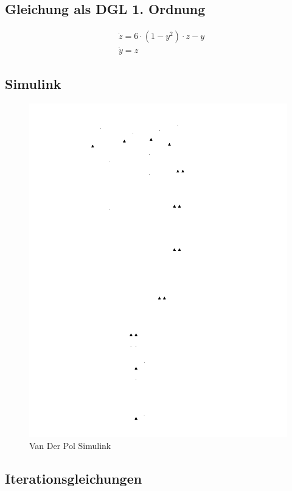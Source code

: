 \documentclass[10pt]{scrartcl}
\begin{document}
	\subsection{Gleichung als DGL 1. Ordnung}
		\begin{align}
			&\dot{z} = 6 \cdot (1-y^2) \cdot z - y\\
			&\dot{y} = z
		\end{align}
		
		\subsection{Simulink}
		\begin{figure}[H]
			\centering	
			\includegraphics[width=\textwidth, angle=-90]{Prak1Aufg2Simulink.png}
            \caption{Van Der Pol Simulink}
            \label{pic:lorenzSimulink}
		\end{figure} 	
		
	\subsection{Iterationsgleichungen}	
\end{document}
